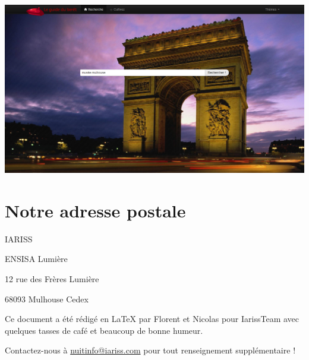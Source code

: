 \documentclass[12pt, a4paper]{article}
\newcommand{\espace}{\vspace{.8cm}}
\newcommand{\authors}{Florent et Nicolas}
\begin{document}
\espace{}
\begin{center}
\includegraphics[width=.9\textwidth, keepaspectratio=true]{img/abase1.png}
\end{center}

\espace{}
\section*{Notre adresse postale}
	
IARISS


ENSISA Lumière

12 rue des Frères Lumière

68093 Mulhouse Cedex


\espace\vfill{}
Ce document a été rédigé en \LaTeX{} par \authors{} pour IarissTeam avec quelques tasses de café et beaucoup de bonne humeur.

Contactez-nous à \href{mailto:nuitinfo@iariss.com}{nuitinfo@iariss.com} pour tout renseignement supplémentaire !
\end{document}
